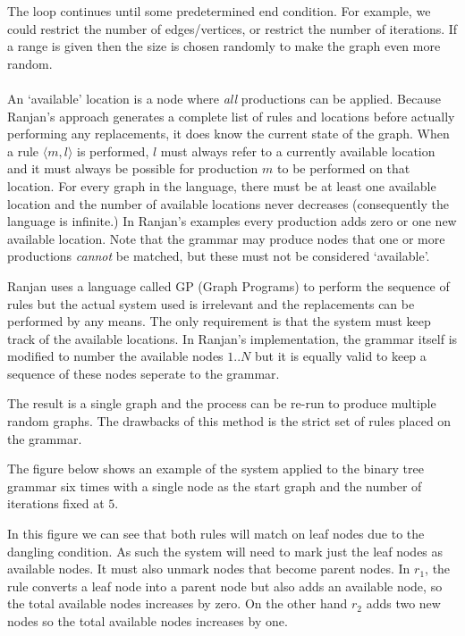 \documentclass{article}
\begin{document}
  The loop continues until some predetermined end condition. For example, we could restrict the number of edges/vertices, or restrict the number of iterations. If a range is given then the size is chosen randomly to make the graph even more random.

  \paragraph{}

  An `available' location is a node where \emph{all} productions can be applied. Because Ranjan's approach generates a complete list of rules and locations before actually performing any replacements, it does know the current state of the graph. When a rule $\langle m,l \rangle$ is performed, $l$ must always refer to a currently available location and it must always be possible for production $m$ to be performed on that location. For every graph in the language, there must be at least one available location and the number of available locations never decreases (consequently the language is infinite.) In Ranjan's examples every production adds zero or one new available location. Note that the grammar may produce nodes that one or more productions \emph{cannot} be matched, but these must not be considered `available'.
  
  Ranjan uses a language called GP (Graph Programs) to perform the sequence of rules but the actual system used is irrelevant and the replacements can be performed by any means. The only requirement is that the system must keep track of the available locations. In Ranjan's implementation, the grammar itself is modified to number the available nodes $1..N$ but it is equally valid to keep a sequence of these nodes seperate to the grammar.

  The result is a single graph and the process can be re-run to produce multiple random graphs. The drawbacks of this method is the strict set of rules placed on the grammar.

  

  The figure below shows an example of the system applied to the binary tree grammar six times with a single node as the start graph and the number of iterations fixed at $5$.

  

  In this figure we can see that both rules will match on leaf nodes due to the dangling condition. As such the system will need to mark just the leaf nodes as available nodes. It must also unmark nodes that become parent nodes. In $r_1$, the rule converts a leaf node into a parent node but also adds an available node, so the total available nodes increases by zero. On the other hand $r_2$ adds two new nodes so the total available nodes increases by one.
\end{document}

